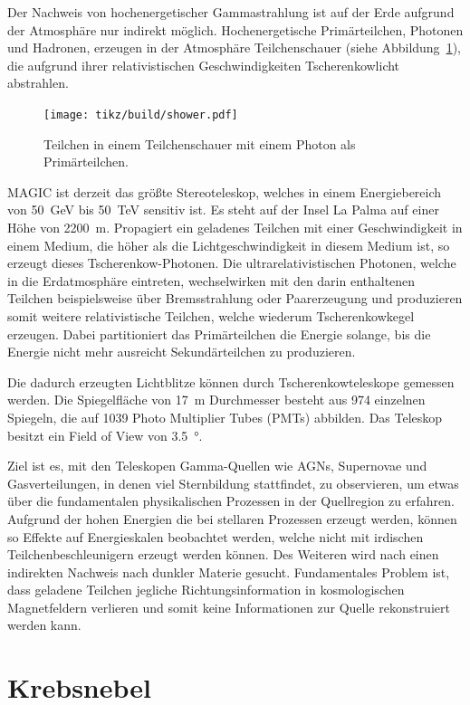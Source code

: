 Der Nachweis von hochenergetischer Gammastrahlung ist auf der Erde aufgrund der
Atmosphäre nur indirekt möglich.
Hochenergetische Primärteilchen, Photonen und Hadronen, erzeugen in der Atmosphäre
Teilchenschauer (siehe Abbildung~\ref{fig:schauer}), die aufgrund ihrer relativistischen Geschwindigkeiten Tscherenkowlicht abstrahlen.
\begin{figure}
		\texttt{[image: tikz/build/shower.pdf]}
		\caption{Teilchen in einem Teilchenschauer mit einem Photon als
    Pri\-mär\-teil\-chen.}%
    \label{fig:schauer}
\end{figure}
MAGIC ist derzeit das größte Stereoteleskop,
welches in einem Energiebereich von \SI{50}{\giga\electronvolt} bis
\SI{50}{\tera\electronvolt} sensitiv ist.
Es steht auf der Insel La Palma auf einer Höhe von \SI{2200}{\meter}.
Propagiert ein geladenes Teilchen mit einer Geschwindigkeit in einem
Medium, die höher als die Lichtgeschwindigkeit in diesem Medium ist,
so erzeugt dieses Tscherenkow-Photonen.
Die ultrarelativistischen Photonen, welche in die Erdatmosphäre eintreten,
wechselwirken mit den darin enthaltenen Teilchen beispielsweise über
Bremsstrahlung oder Paarerzeugung und produzieren somit weitere
relativistische Teilchen, welche wiederum Tscherenkowkegel erzeugen.
Dabei partitioniert das Primärteilchen die Energie solange, bis die Energie
nicht mehr ausreicht Sekundärteilchen zu produzieren.

Die dadurch erzeugten Lichtblitze können durch Tscherenkowteleskope gemessen
werden.
Die Spiegelfläche von \SI{17}{\meter} Durchmesser besteht aus \num{974} einzelnen
Spiegeln, die auf \num{1039} Photo Multiplier Tubes (PMTs) abbilden.
Das Teleskop besitzt ein Field of View von \SI{3.5}{\degree}.

Ziel ist es, mit den Teleskopen Gamma-Quellen wie AGNs, Supernovae und
Gasverteilungen, in denen viel Sternbildung stattfindet, zu observieren, um etwas
über die fundamentalen physikalischen Prozessen in der Quellregion zu erfahren.
Aufgrund der hohen Energien die bei stellaren Prozessen erzeugt werden, können
so Effekte auf Energieskalen beobachtet werden, welche nicht mit irdischen
Teilchenbeschleunigern erzeugt werden können.
Des Weiteren wird nach einen indirekten Nachweis nach dunkler Materie gesucht.
Fundamentales Problem ist, dass geladene Teilchen jegliche Richtungsinformation
in kosmologischen Magnetfeldern verlieren und somit keine Informationen zur
Quelle rekonstruiert werden kann.

\section*{Krebsnebel}%
\label{sec:krebsnebel}

